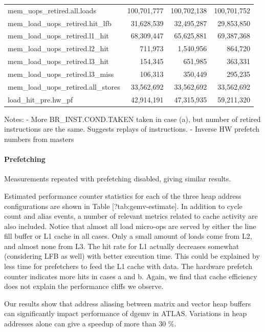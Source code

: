 \documentclass[a4paper,10pt,twocolumn,twoside]{article}
\newcommand{\perfctr}[1] {
  {\lowercase{#1}}
}
\begin{document}
{\begin{table}[t]
\begin{tabular}{l r r r}
    \perfctr{mem_uops_retired.all.loads} & 100,701,777 & 100,702,138 & 100,701,752 \\
    \perfctr{mem_load_uops_retired.hit_lfb} & 31,628,539 & 32,495,287 & 29,853,850 \\
    \perfctr{mem_load_uops_retired.l1_hit} & 68,309,447 & 65,625,881 & 69,387,368 \\
    \perfctr{mem_load_uops_retired.l2_hit} & 711,973 & 1,540,956 & 864,720 \\
    \perfctr{mem_load_uops_retired.l3_hit} & 154,345 & 651,985 & 363,331 \\
    \perfctr{mem_load_uops_retired.l3_miss} & 106,313 & 350,449 & 295,235 \\
    \perfctr{mem_load_uops_retired.all_stores} & 33,562,692 & 33,562,692 & 33,562,692 \\

    \perfctr{load_hit_pre.hw_pf} & 42,914,191 & 47,315,935 & 59,211,320 \\
    \bottomrule
  \end{tabular}
\end{table}

Notes: 
 - More BR\_INST.COND.TAKEN taken in case (a), but number of retired instructions are the same. Suggests replays of instructions.
 - Inverse HW prefetch numbers from masters

\paragraph{Prefetching}
Measurements repeated with prefetching disabled, giving similar results. 

Estimated performance counter statistics for each of the three heap address configurations are shown in Table [?tab:gemv-estimate].
In addition to cycle count and alias events, a number of relevant metrics related to cache activity are also included.
Notice that almost all load micro-ops are served by either the line fill buffer or L1 cache in all cases.
Only a small amount of loads come from L2, and almost none from L3.
The hit rate for L1 actually decreases somewhat (considering LFB as well) with better execution time.
This could be explained by less time for prefetchers to feed the L1 cache with data.
The hardware prefetch counter indicates more hits in cases a and b.
Again, we find that cache efficiency does not explain the performance cliffs we observe. 

Our results show that address aliasing between matrix and vector heap buffers can significantly impact performance of dgemv in ATLAS.
Variations in heap addresses alone can give a speedup of more than 30 \%.


}
\end{document}
